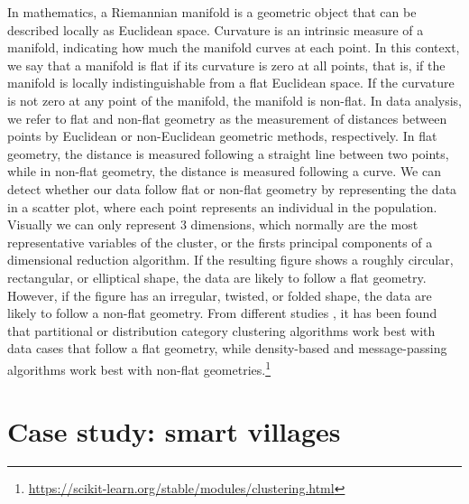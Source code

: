 In mathematics, a Riemannian manifold is a geometric object that can be described locally as Euclidean space. Curvature is an intrinsic measure of a manifold, indicating how much the manifold curves at each point. In this context, we say that a manifold is flat if its curvature is zero at all points, that is, if the manifold is locally indistinguishable from a flat Euclidean space. If the curvature is not zero at any point of the manifold, the manifold is non-flat. In data analysis, we refer to flat and non-flat geometry as the measurement of distances between points by Euclidean or non-Euclidean geometric methods, respectively. In flat geometry, the distance is measured following a straight line between two points, while in non-flat geometry, the distance is measured following a curve. We can detect whether our data follow flat or non-flat geometry by representing the data in a scatter plot, where each point represents an individual in the population. Visually we can only represent 3 dimensions, which normally are the most representative variables of the cluster, or the firsts principal components of a dimensional reduction algorithm. If the resulting figure shows a roughly circular, rectangular, or elliptical shape, the data are likely to follow a flat geometry. However, if the figure has an irregular, twisted, or folded shape, the data are likely to follow a non-flat geometry. From different studies \cite{gallardo2020comparison}, it has been found that partitional or distribution category clustering algorithms work best with data cases that follow a flat geometry, while density-based and message-passing algorithms work best with non-flat geometries.\footnote{\url{https://scikit-learn.org/stable/modules/clustering.html}}

\section{Case study: smart villages} \label{sec:smartvillages}

